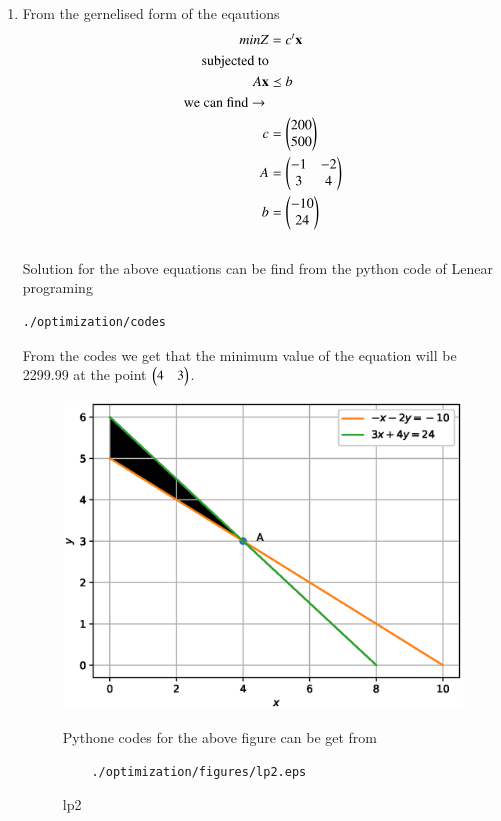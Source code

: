 \renewcommand{\theequation}{\theenumi}
\begin{enumerate}[label=\arabic*.,ref=\thesubsection.\theenumi]
\item From the gernelised form of the eqautions 
\begin{align}
minZ &= c^t \mathbf{x}
\\
\text{subjected to}
\\
A\mathbf{x} &\preceq b
\\ 
\text{we can find $\to$ }
\\
c &= \begin{pmatrix}200\\ 500\end{pmatrix}
\\
A &= \begin{pmatrix}-1 & -2 \\ 3 & 4\end{pmatrix}
\\
b &= \begin{pmatrix}-10\\ 24\end{pmatrix}
\\
\end{align}\\
Solution for the above equations can be find from the python code of Lenear programing 
\begin{lstlisting}
./optimization/codes
\end{lstlisting}
From the codes we get that the minimum value of the equation will be 2299.99 at the point $\begin{pmatrix}4 & 3\end{pmatrix}$.

\begin{figure}[!ht]
	\centering
	\includegraphics[width=\columnwidth]{./figures/lp2.eps}
	\caption{ lp2 }
	\label{fig:lp2}
	Pythone codes for the above figure can be get from
	\begin{lstlisting}
	./optimization/figures/lp2.eps
	\end{lstlisting}	
\end{figure}
\end{enumerate}